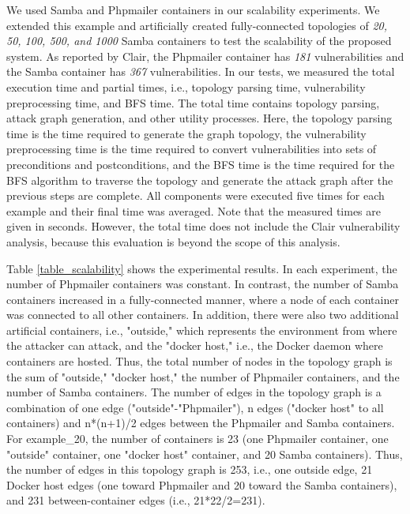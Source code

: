 We used Samba \cite{samba} and Phpmailer \cite{phpmailer} containers in our scalability experiments. We extended this example and artificially created fully-connected topologies of \textit{20, 50, 100, 500, and 1000} Samba containers to test the scalability of the proposed system. As reported by Clair, the Phpmailer container has \textit{181} vulnerabilities and the Samba container has \textit{367} vulnerabilities. In our tests, we measured the total execution time and partial times, i.e., topology parsing time, vulnerability preprocessing time, and BFS time. The total time contains topology parsing, attack graph generation, and other utility processes. Here, the topology parsing time is the time required to generate the graph topology, the vulnerability preprocessing time is the time required to convert vulnerabilities into sets of preconditions and postconditions, and the BFS time is the time required for the BFS algorithm to traverse the topology and generate the attack graph after the previous steps are complete. All components were executed five times for each example and their final time was averaged. Note that the measured times are given in seconds.  However, the total time does not include the Clair vulnerability analysis, because this evaluation is beyond the scope of this analysis.

Table \ref{table_scalability} shows the experimental results. In each experiment, the number of Phpmailer containers was constant. In contrast, the number of Samba containers increased in a fully-connected manner, where a node of each container was connected to all other containers. In addition, there were also two additional artificial containers, i.e., "outside," which represents the environment from where the attacker can attack, and the "docker host," i.e., the Docker daemon where containers are hosted. Thus, the total number of nodes in the topology graph is the sum of "outside," "docker host," the number of Phpmailer containers, and the number of Samba containers. The number of edges in the topology graph is a combination of one edge ("outside"-"Phpmailer"), n edges ("docker host" to all containers) and n*(n+1)/2 edges between the Phpmailer and Samba containers. For example\_20, the number of containers is 23 (one Phpmailer container, one "outside" container, one "docker host" container, and 20 Samba containers). Thus, the number of edges in this topology graph is 253, i.e., one outside edge, 21 Docker host edges (one toward Phpmailer and 20 toward the Samba containers), and 231 between-container edges (i.e., 21*22/2=231).

